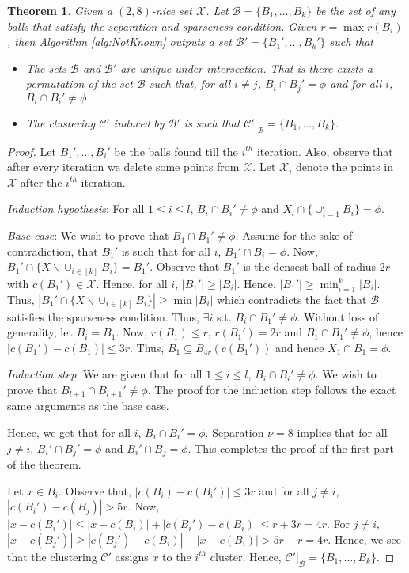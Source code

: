 \documentclass[twoside]{article}
\newcommand{\mc}{\mathcal}
\newtheorem{theorem}{Theorem}
\begin{document}
\begin{theorem}
Given a $(2,8)$-nice set $\mc X$. Let $\mc B = \{B_1,\ldots,B_k\}$ be the set of any balls that satisfy the separation and sparseness condition. Given $r = \max r(B_i)$, then Algorithm \ref{alg:NotKnown} outputs a set $\mc B' = \{B_1',\ldots,B_k'\}$ such that 
\begin{itemize}
	\item The sets $\mc B$ and $\mc B'$ are unique under intersection. That is there exists a permutation of the set $\mc B$ such that, for all $i\neq j$, $B_i \cap B_j' = \phi$ and for all $i$, $B_i \cap B_i' \neq \phi$
	\item The clustering $\mc C'$ induced by $\mc B'$ is such that $\mc C'|_\mc B = \{B_1,\ldots,B_k\}$.	
\end{itemize}

\end{theorem}
\begin{proof} Let $B_1',\ldots,B_i'$ be the balls found till the $i^{th}$ iteration. Also, observe that after every iteration we delete some points from $\mc X$. Let $\mc X_i$ denote the points in $\mc X$ after the $i^{th}$ iteration. 

\textit{Induction hypothesis}: For all $1\le i \le l$, $B_i \cap B_i' \neq \phi$ and $X_l \cap \{\cup_{i=1}^l B_i\} = \phi$.

\textit{Base case}: We wish to prove that $B_1 \cap B_1' \neq \phi$. Assume for the sake of contradiction, that $B_1'$ is such that for all $i$, $B_1' \cap B_i = \phi$. Now, $B_1' \cap \{X \backslash \cup_{i\in[k]} B_i\} = B_1'$. Observe that $B_1'$ is the densest ball of radius $2r$ with $c(B_1') \in \mathcal{X}$. Hence, for all $i$, $|B_1'| \ge |B_i|$. Hence, $|B_1'| \ge \min_{i=1}^k |B_i|$. Thus, $|B_1' \cap \{X \backslash \cup_{i\in[k]} B_i\}| \ge \min |B_i|$ which contradicts the fact that $\mc B$ satisfies the sparseness condition. Thus, $\exists i$ s.t. $B_i \cap B_1' \neq \phi$. Without loss of generality, let $B_i = B_1$. Now, $r(B_1) \le r$, $r(B_1') = 2r$ and $B_1 \cap B_1' \neq \phi$, hence $|c(B_1')-c(B_1)| \le 3r$. Thus, $B_1 \subseteq B_{4r}(c(B_1'))$ and hence $X_1 \cap B_1 = \phi$. 

\textit{Induction step}: We are given that for all $1\le i \le l$, $B_i \cap B_i' \neq \phi$. We wish to prove that $B_{l+1} \cap B_{l+1}' \neq \phi$. The proof for the induction step follows the exact same arguments as the base case.

Hence, we get that for all $i$, $B_i \cap B_i' = \phi$. Separation $\nu = 8$ implies that for all $j\neq i$, $B_i' \cap B_j' = \phi$ and $B_i' \cap B_j = \phi$. This completes the proof of the first part of the theorem.

Let $x \in B_i$. Observe that, $|c(B_i)-c(B_i')| \le 3r$ and for all $j\neq i$, $|c(B_i')-c(B_j)| > 5r$. Now, $|x-c(B_i')| \le |x-c(B_i)| + |c(B_i')-c(B_i)| \le r+3r = 4r$. For $j \neq i$, $|x-c(B_j')| \ge |c(B_j')-c(B_i)| - |x-c(B_i)| > 5r - r = 4r$. Hence, we see that the clustering $\mc C'$ assigns $x$ to the $i^{th}$ cluster. Hence, $\mc C'|_\mc B = \{B_1,\ldots,B_k\}$.
\end{proof}
\end{document}
